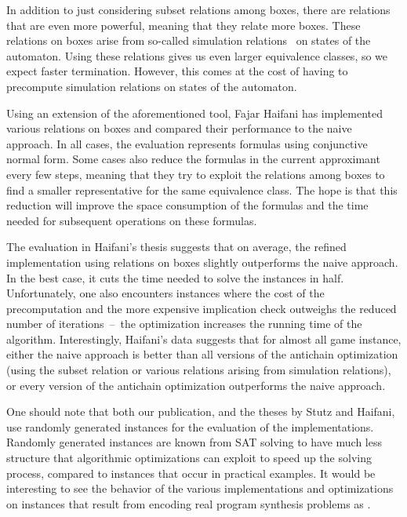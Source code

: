 \documentclass[../../diss.tex]{subfiles}
\begin{document}
In addition to just considering subset relations among boxes, there are relations that are even more powerful, meaning that they relate more boxes.
These relations on boxes arise from so-called simulation relations~\cite{DillHW91} on states of the automaton.
Using these relations gives us even larger equivalence classes, so we expect faster termination.
However, this comes at the cost of having to precompute simulation relations on states of the automaton.

Using an extension of the aforementioned tool, Fajar Haifani has implemented various relations on boxes and compared their performance to the naive approach.
In all cases, the evaluation represents formulas using conjunctive normal form.
Some cases also reduce the formulas in the current approximant every few steps, meaning that they try to exploit the relations among boxes to find a smaller representative for the same equivalence class.
The hope is that this reduction will improve the space consumption of the formulas and the time needed for subsequent operations on these formulas.

The evaluation in Haifani's thesis suggests that on average, the refined implementation using relations on boxes slightly outperforms the naive approach.
In the best case, it cuts the time needed to solve the instances in half.
Unfortunately, one also encounters instances where the cost of the precomputation and the more expensive implication check outweighs the reduced number of iterations~--~the optimization increases the running time of the algorithm.
Interestingly, Haifani's data suggests that for almost all game instance, either the naive approach is better than all versions of the antichain optimization (using the subset relation or various relations arising from simulation relations), or every version of the antichain optimization outperforms the naive approach.

One should note that both our publication, and the theses by Stutz and Haifani, use randomly generated instances for the evaluation of the implementations.
Randomly generated instances are known from \eg SAT solving to have much less structure that algorithmic optimizations can exploit to speed up the solving process, compared to instances that occur in practical examples.
It would be interesting to see the behavior of the various implementations and optimizations on instances that result from \eg encoding real program synthesis problems as .
\end{document}

